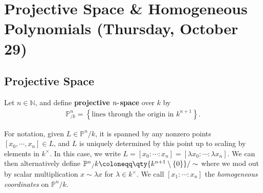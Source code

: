 \hypertarget{projective-space-homogeneous-polynomials-thursday-october-29}{%
\section{Projective Space \& Homogeneous Polynomials (Thursday, October
29)}\label{projective-space-homogeneous-polynomials-thursday-october-29}}

\hypertarget{projective-space}{%
\subsection{Projective Space}\label{projective-space}}

\begin{definition}

Let \(n\in {\mathbb{N}}\), and define \textbf{projective
\(n{\hbox{-}}\)space} over \(k\) by\\
\begin{align*}  
{\mathbb{P}}^n_{/k} = \left\{{\text{lines through the origin in } k^{n+1}}\right\}
.\end{align*}

\end{definition}

\begin{remark}

For notation, given \(L\in {\mathbb{P}}^n/k\), it is spanned by any
nonzero points \({\left[ {x_0, \cdots, x_n} \right]} \in L\), and \(L\)
is uniquely determined by this point up to scaling by elements in
\(k^{\times}\). In this case, we write
\(L = {\left[ {x_0: \cdots : x_n} \right]} = {\left[ {\lambda x_0: \cdots : \lambda x_n} \right]}\).
We can then alternatively define
\({\mathbb{P}}^n{_/k} \coloneqq\qty{ k^{n+1}\setminus\left\{{0}\right\}} / \sim\)
where we mod out by scalar multiplication \(x\sim \lambda x\) for
\(\lambda\in k^{\times}\). We call \([x_1 : \cdots : x_n]\) the
\emph{homogeneous coordinates} on \({\mathbb{P}}^n/k\).

\end{remark}


